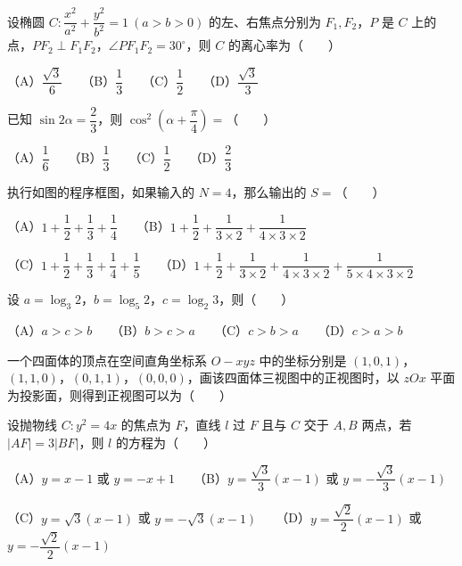 \begin{question}
设椭圆 $C:\dfrac{x^2}{a^2}+\dfrac{y^2}{b^2}=1\ (a>b>0)$ 的左、右焦点分别为 $F_1,F_2$，$P$ 是 $C$ 上的点，$PF_2\perp F_1F_2$，$\angle PF_1F_2=30^\circ$，则 $C$ 的离心率为\mbox{（　　）}

（A）$\dfrac{\sqrt3}{6}$　　（B）$\dfrac13$　　（C）$\dfrac12$　　（D）$\dfrac{\sqrt3}{3}$

\end{question}
\begin{question}
已知 $\sin2\alpha=\dfrac23$，则 $\cos^2\left(\alpha+\dfrac\pi4\right)=$\mbox{（　　）}

（A）$\dfrac16$　　（B）$\dfrac13$　　（C）$\dfrac12$　　（D）$\dfrac23$

\Needspace{0.4\textheight}
\end{question}
\begin{question}
执行如图的程序框图，如果输入的 $N=4$，那么输出的 $S=$\mbox{（　　）}
\nopagebreak[4]
\begin{center}\end{center}
\nopagebreak[4]
（A）$1+\dfrac12+\dfrac13+\dfrac14$　　（B）$1+\dfrac12+\dfrac1{3\times2}+\dfrac1{4\times3\times2}$

（C）$1+\dfrac12+\dfrac13+\dfrac14+\dfrac15$　　（D）$1+\dfrac12+\dfrac1{3\times2}+\dfrac1{4\times3\times2}+\dfrac1{5\times4\times3\times2}$

\end{question}
\begin{question}
设 $a=\log_3 2$，$b=\log_5 2$，$c=\log_2 3$，则\mbox{（　　）}

（A）$a>c>b$　　（B）$b>c>a$　　（C）$c>b>a$　　（D）$c>a>b$

\Needspace{0.4\textheight}
\end{question}
\begin{question}
一个四面体的顶点在空间直角坐标系 $O-xyz$ 中的坐标分别是 $(1,0,1)$，$(1,1,0)$，$(0,1,1)$，$(0,0,0)$，画该四面体三视图中的正视图时，以 $zOx$ 平面为投影面，则得到正视图可以为\mbox{（　　）}
\nopagebreak[4]
\begin{center}\end{center}
\nopagebreak[4]
\end{question}
\begin{question}
设抛物线 $C:y^2=4x$ 的焦点为 $F$，直线 $l$ 过 $F$ 且与 $C$ 交于 $A,B$ 两点，若 $|AF|=3|BF|$，则 $l$ 的方程为\mbox{（　　）}

（A）$y=x-1$ 或 $y=-x+1$　　（B）$y=\dfrac{\sqrt3}{3}(x-1)$ 或 $y=-\dfrac{\sqrt3}{3}(x-1)$

（C）$y=\sqrt3(x-1)$ 或 $y=-\sqrt3(x-1)$　　（D）$y=\dfrac{\sqrt2}{2}(x-1)$ 或 $y=-\dfrac{\sqrt2}{2}(x-1)$

\end{question}
